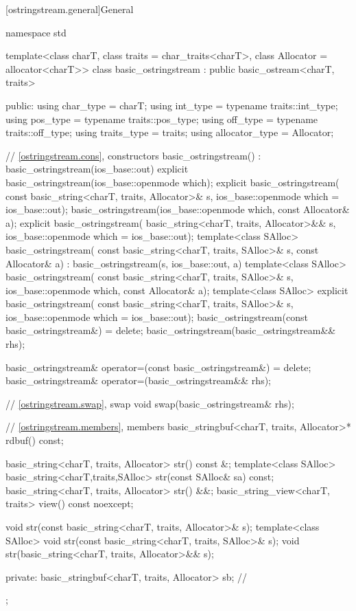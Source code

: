 [ostringstream.general]{General}

%
\begin{codeblock}
namespace std {
  template<class charT, class traits = char_traits<charT>,
           class Allocator = allocator<charT>>
  class basic_ostringstream : public basic_ostream<charT, traits> {
  public:
    using char_type      = charT;
    using int_type       = typename traits::int_type;
    using pos_type       = typename traits::pos_type;
    using off_type       = typename traits::off_type;
    using traits_type    = traits;
    using allocator_type = Allocator;

    // \ref{ostringstream.cons}, constructors
    basic_ostringstream() : basic_ostringstream(ios_base::out) {}
    explicit basic_ostringstream(ios_base::openmode which);
    explicit basic_ostringstream(
      const basic_string<charT, traits, Allocator>& s,
      ios_base::openmode which = ios_base::out);
    basic_ostringstream(ios_base::openmode which, const Allocator& a);
    explicit basic_ostringstream(
      basic_string<charT, traits, Allocator>&& s,
      ios_base::openmode which = ios_base::out);
    template<class SAlloc>
      basic_ostringstream(
        const basic_string<charT, traits, SAlloc>& s, const Allocator& a)
        : basic_ostringstream(s, ios_base::out, a) {}
    template<class SAlloc>
      basic_ostringstream(
        const basic_string<charT, traits, SAlloc>& s,
        ios_base::openmode which, const Allocator& a);
    template<class SAlloc>
      explicit basic_ostringstream(
        const basic_string<charT, traits, SAlloc>& s,
        ios_base::openmode which = ios_base::out);
    basic_ostringstream(const basic_ostringstream&) = delete;
    basic_ostringstream(basic_ostringstream&& rhs);

    basic_ostringstream& operator=(const basic_ostringstream&) = delete;
    basic_ostringstream& operator=(basic_ostringstream&& rhs);

    // \ref{ostringstream.swap}, swap
    void swap(basic_ostringstream& rhs);

    // \ref{ostringstream.members}, members
    basic_stringbuf<charT, traits, Allocator>* rdbuf() const;

    basic_string<charT, traits, Allocator> str() const &;
    template<class SAlloc>
      basic_string<charT,traits,SAlloc> str(const SAlloc& sa) const;
    basic_string<charT, traits, Allocator> str() &&;
    basic_string_view<charT, traits> view() const noexcept;

    void str(const basic_string<charT, traits, Allocator>& s);
    template<class SAlloc>
      void str(const basic_string<charT, traits, SAlloc>& s);
    void str(basic_string<charT, traits, Allocator>&& s);

   private:
    basic_stringbuf<charT, traits, Allocator> sb;   // \expos
  };
}
\end{codeblock}

